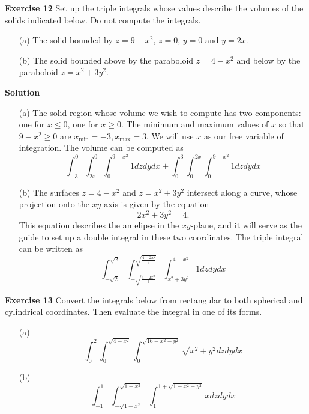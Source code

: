 \documentclass[12pt,oneside]{exam}
\newenvironment{exercise}[1]{\vspace{.1in}\noindent\textbf{Exercise #1 \hspace{.05em}}}{}
\newenvironment{newsolution}{\vspace{.1in}\noindent\textbf{Solution \hspace{.05em}}}{}
\begin{document}
\begin{exercise}{12}
Set up the triple integrals whose values describe the volumes of the solids indicated below. Do not compute the integrals. 
\begin{itemize}
\item[(a)] The solid bounded by $z=9-x^2$, $z=0$, $y=0$ and $y=2x$. 
\item[(b)] The solid bounded above by the paraboloid $z=4-x^2$ and below by the paraboloid $z=x^2+3y^2$. 
\end{itemize}
\end{exercise}

\begin{newsolution}
\begin{itemize}
\item[(a)] The solid region whose volume we wish to compute has two components: one for $x \leq 0$, one for $x\geq 0$. The minimum and maximum values of $x$ so that $9-x^2 \geq 0$ are $x_{\textrm{min}}=-3, x_{\textrm{max}}=3$. We will use $x$ as our free variable of integration. The volume can be computed  as 
\begin{equation*}
\int_{-3}^{0} \int_{2x}^{0} \int_{0}^{9-x^2} 1 dz dy dx + \int_{0}^{3} \int_{0}^{2x} \int_{0}^{9-x^2} 1 dz dy dx
\end{equation*}
\item[(b)] The surfaces $z=4-x^2$ and $z=x^2+3y^2$ intersect along a curve, whose projection onto the $xy$-axis is given by the equation 
\begin{equation*}
2x^2+3y^2 = 4.
\end{equation*}
This equation describes the an elipse in the $xy$-plane, and it will serve as the guide to set up a double integral in these two coordinates. The triple integral can be written as 
\begin{equation*}
\int_{-\sqrt{2}}^{\sqrt{2}} \int_{-\sqrt{\frac{4-2x^2}{3}}}^{\sqrt{\frac{4-2x^2}{3}}} \int_{x^2+3y^2}^{4-x^2} 1 dz dy dx 
\end{equation*}
\end{itemize}
\end{newsolution}

\begin{exercise}{13}
Convert the integrals below from rectangular to both spherical and cylindrical coordinates. Then evaluate the integral in one of its forms. 
\begin{itemize}
\item[(a)]
\begin{equation*}
\int_{0}^{2} \int_{0}^{\sqrt{4-x^2}} \int_{0}^{\sqrt{16-x^2-y^2}} \sqrt{x^2+y^2} dz dy dx
\end{equation*}
\item[(b)]
\begin{equation*}
\int_{-1}^{1} \int_{-\sqrt{1-x^2}}^{\sqrt{1-x^2}} \int_{1}^{1+\sqrt{1-x^2-y^2}} x dz dy dx
\end{equation*}
\end{itemize}
\end{exercise}
\end{document}
